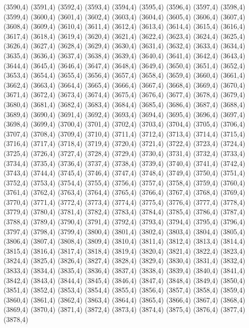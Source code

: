 (3590,4)
(3591,4)
(3592,4)
(3593,4)
(3594,4)
(3595,4)
(3596,4)
(3597,4)
(3598,4)
(3599,4)
(3600,4)
(3601,4)
(3602,4)
(3603,4)
(3604,4)
(3605,4)
(3606,4)
(3607,4)
(3608,4)
(3609,4)
(3610,4)
(3611,4)
(3612,4)
(3613,4)
(3614,4)
(3615,4)
(3616,4)
(3617,4)
(3618,4)
(3619,4)
(3620,4)
(3621,4)
(3622,4)
(3623,4)
(3624,4)
(3625,4)
(3626,4)
(3627,4)
(3628,4)
(3629,4)
(3630,4)
(3631,4)
(3632,4)
(3633,4)
(3634,4)
(3635,4)
(3636,4)
(3637,4)
(3638,4)
(3639,4)
(3640,4)
(3641,4)
(3642,4)
(3643,4)
(3644,4)
(3645,4)
(3646,4)
(3647,4)
(3648,4)
(3649,4)
(3650,4)
(3651,4)
(3652,4)
(3653,4)
(3654,4)
(3655,4)
(3656,4)
(3657,4)
(3658,4)
(3659,4)
(3660,4)
(3661,4)
(3662,4)
(3663,4)
(3664,4)
(3665,4)
(3666,4)
(3667,4)
(3668,4)
(3669,4)
(3670,4)
(3671,4)
(3672,4)
(3673,4)
(3674,4)
(3675,4)
(3676,4)
(3677,4)
(3678,4)
(3679,4)
(3680,4)
(3681,4)
(3682,4)
(3683,4)
(3684,4)
(3685,4)
(3686,4)
(3687,4)
(3688,4)
(3689,4)
(3690,4)
(3691,4)
(3692,4)
(3693,4)
(3694,4)
(3695,4)
(3696,4)
(3697,4)
(3698,4)
(3699,4)
(3700,4)
(3701,4)
(3702,4)
(3703,4)
(3704,4)
(3705,4)
(3706,4)
(3707,4)
(3708,4)
(3709,4)
(3710,4)
(3711,4)
(3712,4)
(3713,4)
(3714,4)
(3715,4)
(3716,4)
(3717,4)
(3718,4)
(3719,4)
(3720,4)
(3721,4)
(3722,4)
(3723,4)
(3724,4)
(3725,4)
(3726,4)
(3727,4)
(3728,4)
(3729,4)
(3730,4)
(3731,4)
(3732,4)
(3733,4)
(3734,4)
(3735,4)
(3736,4)
(3737,4)
(3738,4)
(3739,4)
(3740,4)
(3741,4)
(3742,4)
(3743,4)
(3744,4)
(3745,4)
(3746,4)
(3747,4)
(3748,4)
(3749,4)
(3750,4)
(3751,4)
(3752,4)
(3753,4)
(3754,4)
(3755,4)
(3756,4)
(3757,4)
(3758,4)
(3759,4)
(3760,4)
(3761,4)
(3762,4)
(3763,4)
(3764,4)
(3765,4)
(3766,4)
(3767,4)
(3768,4)
(3769,4)
(3770,4)
(3771,4)
(3772,4)
(3773,4)
(3774,4)
(3775,4)
(3776,4)
(3777,4)
(3778,4)
(3779,4)
(3780,4)
(3781,4)
(3782,4)
(3783,4)
(3784,4)
(3785,4)
(3786,4)
(3787,4)
(3788,4)
(3789,4)
(3790,4)
(3791,4)
(3792,4)
(3793,4)
(3794,4)
(3795,4)
(3796,4)
(3797,4)
(3798,4)
(3799,4)
(3800,4)
(3801,4)
(3802,4)
(3803,4)
(3804,4)
(3805,4)
(3806,4)
(3807,4)
(3808,4)
(3809,4)
(3810,4)
(3811,4)
(3812,4)
(3813,4)
(3814,4)
(3815,4)
(3816,4)
(3817,4)
(3818,4)
(3819,4)
(3820,4)
(3821,4)
(3822,4)
(3823,4)
(3824,4)
(3825,4)
(3826,4)
(3827,4)
(3828,4)
(3829,4)
(3830,4)
(3831,4)
(3832,4)
(3833,4)
(3834,4)
(3835,4)
(3836,4)
(3837,4)
(3838,4)
(3839,4)
(3840,4)
(3841,4)
(3842,4)
(3843,4)
(3844,4)
(3845,4)
(3846,4)
(3847,4)
(3848,4)
(3849,4)
(3850,4)
(3851,4)
(3852,4)
(3853,4)
(3854,4)
(3855,4)
(3856,4)
(3857,4)
(3858,4)
(3859,4)
(3860,4)
(3861,4)
(3862,4)
(3863,4)
(3864,4)
(3865,4)
(3866,4)
(3867,4)
(3868,4)
(3869,4)
(3870,4)
(3871,4)
(3872,4)
(3873,4)
(3874,4)
(3875,4)
(3876,4)
(3877,4)
(3878,4)
